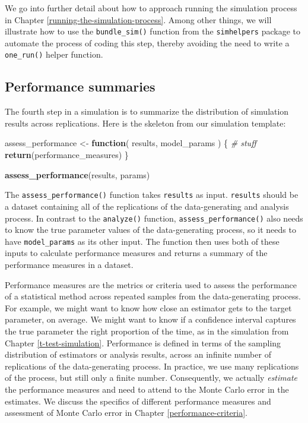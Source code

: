 \documentclass[
]{book}
\newenvironment{Shaded}{\begin{snugshade}}{\end{snugshade}}
\newcommand{\CommentTok}[1]{\textcolor[rgb]{0.56,0.35,0.01}{\textit{#1}}}
\newcommand{\ControlFlowTok}[1]{\textcolor[rgb]{0.13,0.29,0.53}{\textbf{#1}}}
\newcommand{\FunctionTok}[1]{\textcolor[rgb]{0.13,0.29,0.53}{\textbf{#1}}}
\newcommand{\NormalTok}[1]{#1}
\newcommand{\OtherTok}[1]{\textcolor[rgb]{0.56,0.35,0.01}{#1}}
\begin{document}
We go into further detail about how to approach running the simulation process in Chapter \ref{running-the-simulation-process}.
Among other things, we will illustrate how to use the \texttt{bundle\_sim()} function from the \texttt{simhelpers} package to automate the process of coding this step, thereby avoiding the need to write a \texttt{one\_run()} helper function.

\subsection{Performance summaries}\label{performance-summaries}

The fourth step in a simulation is to summarize the distribution of simulation results across replications.
Here is the skeleton from our simulation template:

\begin{Shaded}
\begin{Highlighting}[]
\NormalTok{assess\_performance }\OtherTok{\textless{}{-}} \ControlFlowTok{function}\NormalTok{( results, model\_params ) \{}
  \CommentTok{\# stuff}
  \FunctionTok{return}\NormalTok{(performance\_measures)}
\NormalTok{\}}

\FunctionTok{assess\_performance}\NormalTok{(results, params)}
\end{Highlighting}
\end{Shaded}

The \texttt{assess\_performance()} function takes \texttt{results} as input.
\texttt{results} should be a dataset containing all of the replications of the data-generating and analysis process.
In contrast to the \texttt{analyze()} function, \texttt{assess\_performance()} also needs to know the true parameter values of the data-generating process, so it needs to have \texttt{model\_params} as its other input.
The function then uses both of these inputs to calculate performance measures and returns a summary of the performance measures in a dataset.

Performance measures are the metrics or criteria used to assess the performance of a statistical method across repeated samples from the data-generating process.
For example, we might want to know how close an estimator gets to the target parameter, on average.
We might want to know if a confidence interval captures the true parameter the right proportion of the time, as in the simulation from Chapter \ref{t-test-simulation}.
Performance is defined in terms of the sampling distribution of estimators or analysis results, across an infinite number of replications of the data-generating process.
In practice, we use many replications of the process, but still only a finite number. Consequently, we actually \emph{estimate} the performance measures and need to attend to the Monte Carlo error in the estimates.
We discuss the specifics of different performance measures and assessment of Monte Carlo error in Chapter \ref{performance-criteria}.
\end{document}
